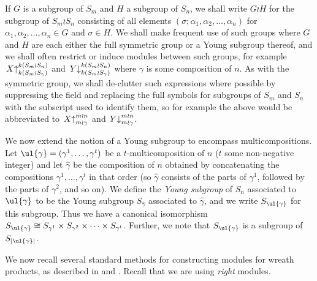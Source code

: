 If $G$ is a subgroup of $S_m$ and $H$ a subgroup of $S_n$, we shall write $G{\wr}H$ for the subgroup of $S_m{\wr}S_n$
consisting of all elements $(\sigma;\alpha_1,\alpha_2,\ldots,\alpha_n)$ for $\alpha_1,\alpha_2,\ldots,\alpha_n \in G$ and $\sigma \in H$.
We shall make frequent use of such groups where $G$ and $H$ are each either the full symmetric group or a Young subgroup thereof, and we
shall often restrict or induce modules between such groups, for example
$\left.X\right\uparrow^{k(S_m{\wr}S_n)}_{k(S_m{\wr}S_\gamma)}$ and $\left.Y\right\downarrow^{k({S_m{\wr}S_n})}_{k({S_m{\wr}S_\gamma})}$
where $\gamma$ is some composition of $n$. As with the symmetric group, we shall de-clutter such expressions where possible by suppressing
the field and replacing the full symbols for subgroups of $S_m$ and $S_n$ with the subscript used to identify them,
so for example the above would be abbreviated to
$\left.X\right\uparrow^{m{\wr}n}_{m{\wr}\gamma}$ and $\left.Y\right\downarrow^{m{\wr}n}_{m{\wr}\gamma}$.

We now extend the notion of a Young subgroup to encompass multicompositions.
Let $\ul{\gamma} = (\gamma^1,\ldots,\gamma^t)$ be a $t$-multicomposition of $n$ ($t$ some non-negative integer) and let $\hat\gamma$ be
the composition of $n$ obtained by concatenating the compositions $\gamma^1,\ldots,\gamma^t$ in that order (so $\hat\gamma$ consists of
the parts of $\gamma^1$, followed by the parts of $\gamma^2$, and so on). We define the \textit{Young subgroup} of $S_n$ associated to
$\ul{\gamma}$ to be the Young subgroup $S_{\hat\gamma}$ associated to $\hat\gamma$, and we write $S_{\ul{\gamma}}$ for this subgroup. Thus we
have a canonical isomorphism $S_{\ul{\gamma}} \cong S_{\gamma^1} \times S_{\gamma^2} \times \cdots \times S_{\gamma^t}$.
Further, we note that $S_{\ul{\gamma}}$ is a subgroup of $S_{|\ul{\gamma}|}$.

We now recall several standard methods for constructing modules for wreath products, as described in
\cite[Section 4.3]{JAMKER} and \cite[Section 3]{CHTAN}. Recall that we are using \textit{right} modules.

